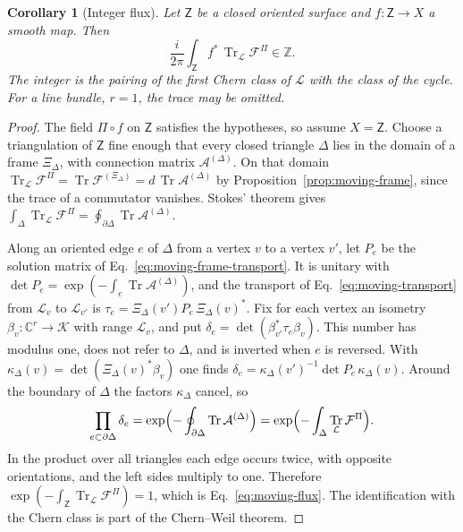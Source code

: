 \documentclass[11pt]{article}
\newtheorem{corollary}[proposition]{Corollary}
\theoremstyle{definition}
\DeclareMathOperator{\Tr}{Tr}
\newcommand{\C}{\mathbb C}
\begin{document}
\begin{corollary}[Integer flux]
\label{cor:moving-flux}
Let $\mathsf Z$ be a closed oriented surface and $f:\mathsf Z\to X$ a smooth map. Then
\begin{equation}
 \frac{i}{2\pi}\int_{\mathsf Z}f^*\,\Tr_{\mathcal L}\mathcal F^\Pi\in\mathbb Z .
 \label{eq:moving-flux}
\end{equation}
The integer is the pairing of the first Chern class of $\mathcal L$ with the class of the cycle. For a line bundle, $r=1$, the trace may be omitted.
\end{corollary}
\begin{proof}
The field $\Pi\circ f$ on $\mathsf Z$ satisfies the hypotheses, so assume $X=\mathsf Z$. Choose a triangulation of $\mathsf Z$ fine enough that every closed triangle $\Delta$ lies in the domain of a frame $\Xi_\Delta$, with connection matrix $\mathcal A^{(\Delta)}$. On that domain $\Tr_{\mathcal L}\mathcal F^\Pi=\Tr\mathcal F^{(\Xi_\Delta)}=d\,\Tr\mathcal A^{(\Delta)}$ by Proposition~\ref{prop:moving-frame}, since the trace of a commutator vanishes. Stokes' theorem gives $\int_\Delta\Tr_{\mathcal L}\mathcal F^\Pi=\oint_{\partial\Delta}\Tr\mathcal A^{(\Delta)}$.

Along an oriented edge $e$ of $\Delta$ from a vertex $v$ to a vertex $v'$, let $P_e$ be the solution matrix of Eq.~\eqref{eq:moving-frame-transport}. It is unitary with $\det P_e=\exp(-\int_e\Tr\mathcal A^{(\Delta)})$, and the transport of Eq.~\eqref{eq:moving-transport} from $\mathcal L_v$ to $\mathcal L_{v'}$ is $\tau_e=\Xi_\Delta(v')P_e\,\Xi_\Delta(v)^*$. Fix for each vertex an isometry $\beta_v:\C^r\to\mathcal K$ with range $\mathcal L_v$, and put $\delta_e=\det(\beta_{v'}^*\tau_e\beta_v)$. This number has modulus one, does not refer to $\Delta$, and is inverted when $e$ is reversed. With $\kappa_\Delta(v)=\det(\Xi_\Delta(v)^*\beta_v)$ one finds $\delta_e=\kappa_\Delta(v')^{-1}\det P_e\,\kappa_\Delta(v)$. Around the boundary of $\Delta$ the factors $\kappa_\Delta$ cancel, so
\[
 \prod_{e\subset\partial\Delta}\delta_e=\exp\Bigl(-\oint_{\partial\Delta}\Tr\mathcal A^{(\Delta)}\Bigr)
   =\exp\Bigl(-\int_\Delta\Tr_{\mathcal L}\mathcal F^\Pi\Bigr).
\]
In the product over all triangles each edge occurs twice, with opposite orientations, and the left sides multiply to one. Therefore $\exp(-\int_{\mathsf Z}\Tr_{\mathcal L}\mathcal F^\Pi)=1$, which is Eq.~\eqref{eq:moving-flux}. The identification with the Chern class is part of the Chern--Weil theorem.
\end{proof}
\end{document}
